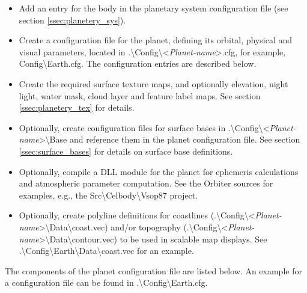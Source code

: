 \documentclass[Orbiter Developer Manual.tex]{subfiles}
\begin{document}
\begin{itemize}
\item Add an entry for the body in the planetary system configuration file (see section \ref{ssec:planetery_sys}).
\item Create a configuration file for the planet, defining its orbital, physical and visual parameters, located in .\textbackslash Config\textbackslash <\textit{Planet-name}>.cfg, for example, Config\textbackslash Earth.cfg. The configuration entries are described below.
\item Create the required surface texture maps, and optionally elevation, night light, water mask, cloud layer and feature label maps. See section \ref{ssec:planetery_tex} for details.
\item Optionally, create configuration files for surface bases in .\textbackslash Config\textbackslash <\textit{Planet-name}>\textbackslash Base and reference them in the planet configuration file. See section \ref{ssec:surface_bases} for details on surface base definitions.
\item Optionally, compile a DLL module for the planet for ephemeris calculations and atmospheric parameter computation. See the Orbiter sources for examples, e.g., the Src\textbackslash Celbody\textbackslash Vsop87 project.
\item Optionally, create polyline definitions for coastlines (.\textbackslash Config\textbackslash <\textit{Planet-name}>\textbackslash Data\textbackslash coast.vec) and/or topography (.\textbackslash Config\textbackslash <\textit{Planet-name}>\textbackslash Data\textbackslash contour.vec) to be used in scalable map displays. See .\textbackslash Config\textbackslash Earth\textbackslash Data\textbackslash coast.vec for an example.
\end{itemize}

\noindent
The components of the planet configuration file are listed below. An example for a configuration file can be found in .\textbackslash Config\textbackslash Earth.cfg.
\end{document}
